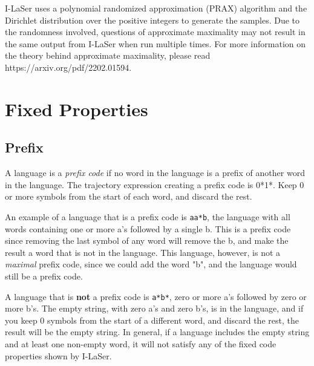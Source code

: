 \documentclass{article}
\begin{document}
\par I-LaSer uses a polynomial randomized approximation (PRAX) algorithm and the Dirichlet distribution over the positive integers to generate the samples. Due to the randomness involved, questions of approximate maximality may not result in the same output from I-LaSer when run multiple times. For more information on the theory behind approximate maximality, please read https://arxiv.org/pdf/2202.01594. 


\section{Fixed Properties}
\subsection{Prefix}
A language is a \textit{prefix code} if no word in the language is a prefix of another word in the language. The trajectory expression creating a prefix code is 0*1*. Keep 0 or more symbols from the start of each word, and discard the rest. 

\par An example of a language that is a prefix code is \verb-aa*b-, the language with all words containing one or more a's followed by a single b. This is a prefix code since removing the last symbol of any word will remove the b, and make the result a word that is not in the language. This language, however, is not a \textit{maximal} prefix code, since we could add the word "b", and the language would still be a prefix code. 

\par A language that is \textbf{not} a prefix code is \verb-a*b*-, zero or more a's followed by zero or more b's. The empty string, with zero a's and zero b's, is in the language, and if you keep 0 symbols from the start of a different word, and discard the rest, the result will be the empty string. In general, if a language includes the empty string and at least one non-empty word, it will not satisfy any of the fixed code properties shown by I-LaSer. 
\end{document}

